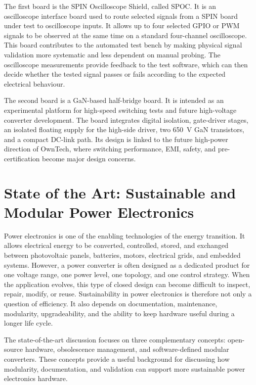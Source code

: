 The first board is the SPIN Oscilloscope Shield, called SPOC. It is an
oscilloscope interface board used to route selected signals from a SPIN board
under test to oscilloscope inputs. It allows up to four selected GPIO or PWM
signals to be observed at the same time on a standard four-channel
oscilloscope. This board contributes to the automated test bench by making
physical signal validation more systematic and less dependent on manual
probing. The oscilloscope measurements provide feedback to the test software,
which can then decide whether the tested signal passes or fails according to
the expected electrical behaviour.

The second board is a GaN-based half-bridge board. It is intended as an
experimental platform for high-speed switching tests and future high-voltage
converter development. The board integrates digital isolation, gate-driver
stages, an isolated floating supply for the high-side driver, two 650~V GaN
transistors, and a compact DC-link path. Its design is linked to the future
high-power direction of OwnTech, where switching performance, EMI, safety, and
pre-certification become major design concerns.







\section{State of the Art: Sustainable and Modular Power Electronics}
\label{sec:sustainable_modular_power_electronics}

Power electronics is one of the enabling technologies of the energy transition.
It allows electrical energy to be converted, controlled, stored, and exchanged
between photovoltaic panels, batteries, motors, electrical grids, and embedded
systems. However, a power converter is often designed as a dedicated product
for one voltage range, one power level, one topology, and one control strategy.
When the application evolves, this type of closed design can become difficult to
inspect, repair, modify, or reuse. Sustainability in power electronics is
therefore not only a question of efficiency. It also depends on documentation,
maintenance, modularity, upgradeability, and the ability to keep hardware useful
during a longer life cycle.

The state-of-the-art discussion focuses on three
complementary concepts: open-source hardware, obsolescence management, and
software-defined modular converters. These concepts provide a useful background
for discussing how modularity, documentation, and validation can support more
sustainable power electronics hardware.

